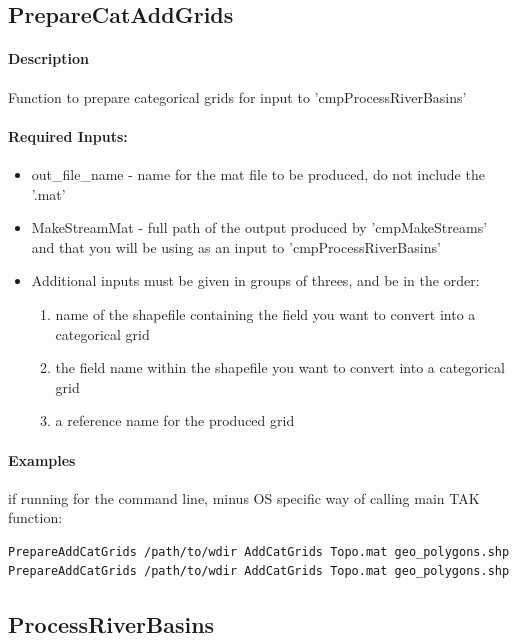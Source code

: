 \subsection{PrepareCatAddGrids} \label{sec:PrepCat}
\paragraph{Description}
Function to prepare categorical grids for input to 'cmpProcessRiverBasins'

\paragraph{ Required Inputs:}
\begin{itemize}
\item out\_file\_name - name for the mat file to be produced, do not include the '.mat'
\item MakeStreamMat - full path of the output produced by 'cmpMakeStreams' and that you will be
using as an input to 'cmpProcessRiverBasins'

\item Additional inputs must be given in groups of threes, and be in the order: 
\begin{enumerate}
\item name of the shapefile containing the field you want to convert into a categorical grid
\item the field name within the shapefile you want to convert into a categorical grid
\item  a reference name for the produced grid
\end{enumerate}
\end{itemize}

\paragraph{Examples} if running for the command line, minus OS specific way of calling main TAK function:
\begin{lstlisting}[language=bash]
PrepareAddCatGrids /path/to/wdir AddCatGrids Topo.mat geo_polygons.shp RTYPE rock_type
PrepareAddCatGrids /path/to/wdir AddCatGrids Topo.mat geo_polygons.shp RTYPE rock_type geo_polygons.shp UNIT unit_name  
\end{lstlisting}

\subsection{ProcessRiverBasins}
